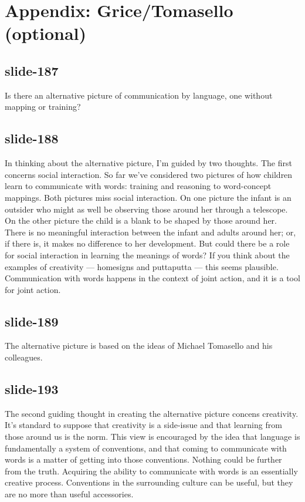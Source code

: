 \documentclass[12pt,\papersize]{extarticle}
\begin{document}
\section{Appendix: Grice/Tomasello (optional)}
 
 
\subsection{slide-187}
Is there an alternative picture of communication by language, one without mapping or training?
 
 
\subsection{slide-188}
In thinking about the alternative picture, I'm guided by two thoughts.
The first concerns social interaction.
So far we've considered two pictures of how children learn to communicate with words: training and reasoning to word-concept mappings.
Both pictures miss social interaction.
On one picture the infant is an outsider who might as well be observing those around her through a telescope.
On the other picture the child is a blank to be shaped by those around her.
There is no meaningful interaction between the infant and adults around her; or, if there is, it makes no difference to her development.
But could there be a role for social interaction in learning the meanings of words?
If you think about the examples of creativity --- homesigns and puttaputta --- this seems plausible.
Communication with words happens in the context of joint action, and it is a tool for joint action.
 
 
\subsection{slide-189}
The alternative picture is based on the ideas of Michael Tomasello and his colleagues.
 
 
\subsection{slide-193}
The second guiding thought in creating the alternative picture concens creativity.
It's standard to suppose that creativity is a side-issue and that learning from those around us is the norm.
This view is encouraged by the idea that language is fundamentally a system of conventions, and that coming to communicate with words is a matter of getting into those conventions.
Nothing could be further from the truth.
Acquiring the ability to communicate with words is an essentially creative process.
Conventions in the surrounding culture can be useful, but they are no more than useful accessories.
 
\end{document}

